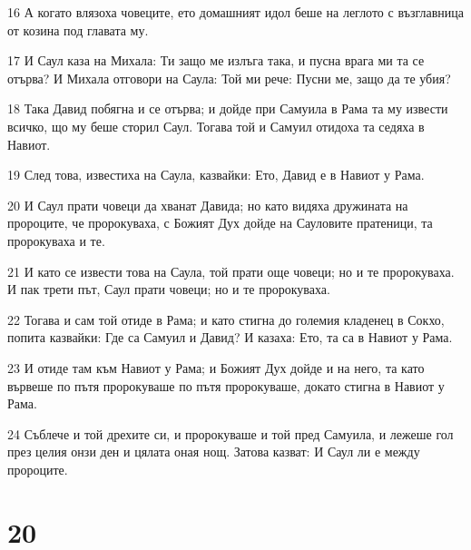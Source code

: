 \par 16 А когато влязоха човеците, ето домашният идол беше на леглото с възглавница от козина под главата му.
\par 17 И Саул каза на Михала: Ти защо ме излъга така, и пусна врага ми та се отърва? И Михала отговори на Саула: Той ми рече: Пусни ме, защо да те убия?
\par 18 Така Давид побягна и се отърва; и дойде при Самуила в Рама та му извести всичко, що му беше сторил Саул. Тогава той и Самуил отидоха та седяха в Навиот.
\par 19 След това, известиха на Саула, казвайки: Ето, Давид е в Навиот у Рама.
\par 20 И Саул прати човеци да хванат Давида; но като видяха дружината на пророците, че пророкуваха, с Божият Дух дойде на Сауловите пратеници, та пророкуваха и те.
\par 21 И като се извести това на Саула, той прати още човеци; но и те пророкуваха. И пак трети път, Саул прати човеци; но и те пророкуваха.
\par 22 Тогава и сам той отиде в Рама; и като стигна до големия кладенец в Сокхо, попита казвайки: Где са Самуил и Давид? И казаха: Ето, та са в Навиот у Рама.
\par 23 И отиде там към Навиот у Рама; и Божият Дух дойде и на него, та като вървеше по пътя пророкуваше по пътя пророкуваше, докато стигна в Навиот у Рама.
\par 24 Съблече и той дрехите си, и пророкуваше и той пред Самуила, и лежеше гол през целия онзи ден и цялата оная нощ. Затова казват: И Саул ли е между пророците.

\chapter{20}

